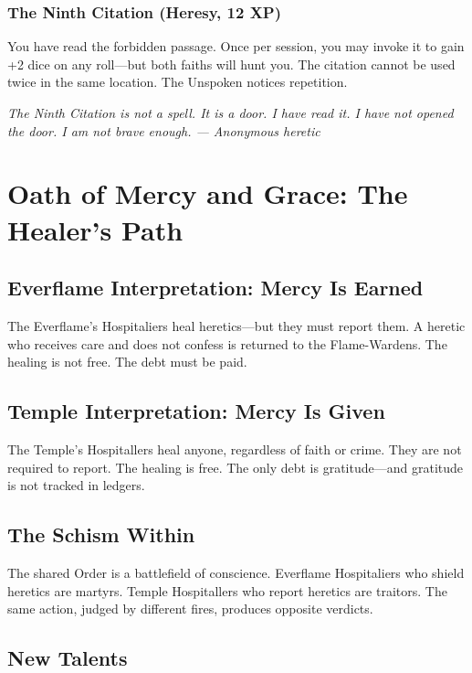 \documentclass{book}
\newcommand{\citation}[1]{\textcolor{marginalia}{\small\textit{#1}}}
\begin{document}
\subsection{The Ninth Citation (Heresy, 12 XP)}

You have read the forbidden passage. Once per session, you may invoke it to gain +2 dice on any roll---but both faiths will hunt you. The citation cannot be used twice in the same location. The Unspoken notices repetition.

\citation{The Ninth Citation is not a spell. It is a door. I have read it. I have not opened the door. I am not brave enough. --- Anonymous heretic}

\chapter{Oath of Mercy and Grace: The Healer's Path}

\section{Everflame Interpretation: Mercy Is Earned}

The Everflame's Hospitaliers heal heretics---but they must report them. A heretic who receives care and does not confess is returned to the Flame-Wardens. The healing is not free. The debt must be paid.

\section{Temple Interpretation: Mercy Is Given}

The Temple's Hospitallers heal anyone, regardless of faith or crime. They are not required to report. The healing is free. The only debt is gratitude---and gratitude is not tracked in ledgers.

\section{The Schism Within}

The shared Order is a battlefield of conscience. Everflame Hospitaliers who shield heretics are martyrs. Temple Hospitallers who report heretics are traitors. The same action, judged by different fires, produces opposite verdicts.

\section{New Talents}
\end{document}
